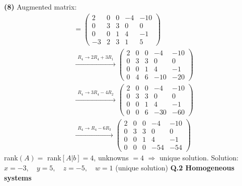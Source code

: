 \noindent\textbf{(8)} Augmented matrix:
\begin{align*}
[A|b] &= \left(\begin{array}{cccc|c}2 & 0 & 0 & -4 & -10 \\ 0 & 3 & 3 & 0 & 0 \\ 0 & 0 & 1 & 4 & -1 \\ -3 & 2 & 3 & 1 & 5\end{array}\right) \\
&\xrightarrow{\substack{R_4\to 2R_4+3R_1}} \left(\begin{array}{cccc|c}2 & 0 & 0 & -4 & -10 \\ 0 & 3 & 3 & 0 & 0 \\ 0 & 0 & 1 & 4 & -1 \\ 0 & 4 & 6 & -10 & -20\end{array}\right) \\
&\xrightarrow{\substack{R_4\to 3R_4-4R_2}} \left(\begin{array}{cccc|c}2 & 0 & 0 & -4 & -10 \\ 0 & 3 & 3 & 0 & 0 \\ 0 & 0 & 1 & 4 & -1 \\ 0 & 0 & 6 & -30 & -60\end{array}\right) \\
&\xrightarrow{\substack{R_4\to R_4-6R_3}} \left(\begin{array}{cccc|c}2 & 0 & 0 & -4 & -10 \\ 0 & 3 & 3 & 0 & 0 \\ 0 & 0 & 1 & 4 & -1 \\ 0 & 0 & 0 & -54 & -54\end{array}\right)
\end{align*}
rank$(A)=$ rank$[A|b]=4$, unknowns $=4$ $\Rightarrow$ unique solution. Solution: $x=-3, \quad y=5, \quad z=-5, \quad w=1$ (unique solution)
\medskip\noindent\textbf{Q.2  Homogeneous systems}\par\smallskip

